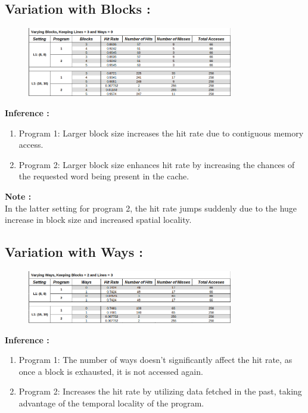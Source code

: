 \documentclass{article}
\begin{document}
\subsection{Variation with Blocks :}
\begin{figure}[H]
  \centering
  \includegraphics[width=0.8\textwidth]{1.2.png}
  \label{fig:example}
\end{figure}
\noindent
\textbf{\large{Inference :}}\\
\begin{enumerate}[label=\alph*)]
  \item Program 1: Larger block size increases the hit rate due to contiguous memory access.
  \item Program 2: Larger block size enhances hit rate by increasing the chances of the requested word being present in the cache.
\end{enumerate}
\textbf{\large{Note :}}\\
In the latter setting for program 2, the hit rate jumps suddenly due to the huge increase in block size and increased spatial locality.
\smallskip

\subsection{Variation with Ways :}
\begin{figure}[H]
  \centering
  \includegraphics[width=0.8\textwidth]{1.3.png}
  \label{fig:example}
\end{figure}
\noindent
\textbf{\large{Inference :}}\\
\begin{enumerate}[label=\alph*)]
  \item Program 1: The number of ways doesn't significantly affect the hit rate, as once a block is exhausted, it is not accessed again.
  \item Program 2: Increases the hit rate by utilizing data fetched in the past, taking advantage of the temporal locality of the program.
\end{enumerate}
\smallskip
\end{document}
